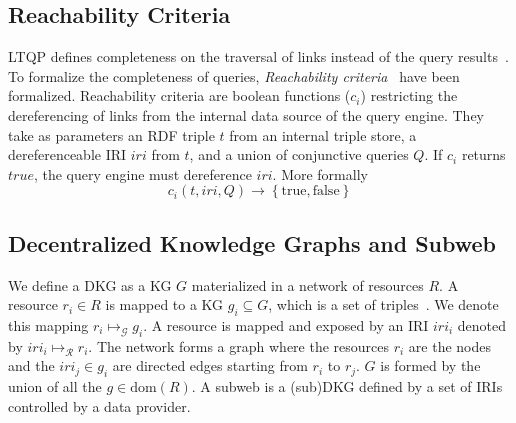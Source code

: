 \subsection{Reachability Criteria}

LTQP defines completeness on the traversal of links instead of the query results~\cite{Hartig2012}.
To formalize the completeness of queries, \emph{Reachability criteria}~\cite{Hartig2012} have been formalized.
Reachability criteria are boolean functions ($c_i$) restricting the dereferencing of links from the internal data source of the query engine.
They take as parameters an RDF triple $t$ from an internal triple store, a dereferenceable IRI $iri$ from $t$, and a union of conjunctive queries $Q$.
If $c_i$ returns $true$, the query engine must dereference $iri$.
More formally
\begin{equation}\label{eq:reachabilityCriteria}
c_i(t, iri, Q) \rightarrow \left\{ \mathrm{true}, \mathrm{false} \right\}
\end{equation}

\subsection{Decentralized Knowledge Graphs and Subweb}\label{sec:dkg}

We define a DKG as a KG $G$ materialized in a network of resources $R$.
A resource $r_i \in R$ is mapped to a KG $g_i \subseteq G$, which is a set of triples~\cite{w3ConceptsAbstract}.
We denote this mapping $r_i \mapsto_{\mathcal{G}} g_i$.
A resource is mapped and exposed by an IRI $iri_i$ denoted by $iri_i \mapsto_{\mathcal{R}} r_i$.
The network forms a graph where the resources $r_i$ are the nodes and the $iri_j \in g_i$ are directed edges starting from $r_i$ to $r_j$.
$G$ is formed by the union of all the $g \in \text{dom}(R)$. %
A subweb is a (sub)DKG defined by a set of IRIs controlled by a data provider.